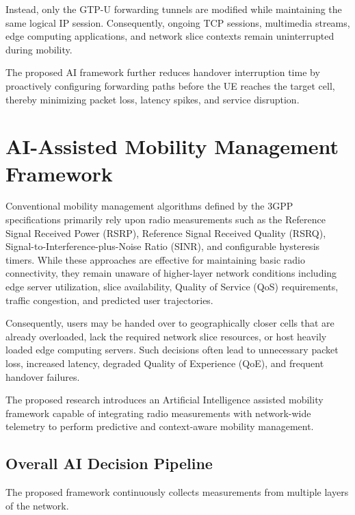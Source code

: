 \documentclass[12pt,a4paper]{article}\usepackage[a4paper,margin=1in]{geometry}\usepackage{graphicx}\usepackage{longtable}\usepackage{booktabs}\usepackage{hyperref}\usepackage{enumitem}\usepackage{amsmath}\usepackage{tikz}\usepackage{pgfgantt}\usepackage{setspace}\setstretch{1.15}\usetikzlibrary{positioning,arrows.meta,shapes.geometric}
\begin{document}
	Instead, only the GTP-U forwarding tunnels are modified while maintaining the same logical IP session. Consequently, ongoing TCP sessions, multimedia streams, edge computing applications, and network slice contexts remain uninterrupted during mobility.
	
	The proposed AI framework further reduces handover interruption time by proactively configuring forwarding paths before the UE reaches the target cell, thereby minimizing packet loss, latency spikes, and service disruption.
	
	\section{AI-Assisted Mobility Management Framework}
	
	Conventional mobility management algorithms defined by the 3GPP specifications primarily rely upon radio measurements such as the Reference Signal Received Power (RSRP), Reference Signal Received Quality (RSRQ), Signal-to-Interference-plus-Noise Ratio (SINR), and configurable hysteresis timers. While these approaches are effective for maintaining basic radio connectivity, they remain unaware of higher-layer network conditions including edge server utilization, slice availability, Quality of Service (QoS) requirements, traffic congestion, and predicted user trajectories.
	
	Consequently, users may be handed over to geographically closer cells that are already overloaded, lack the required network slice resources, or host heavily loaded edge computing servers. Such decisions often lead to unnecessary packet loss, increased latency, degraded Quality of Experience (QoE), and frequent handover failures.
	
	The proposed research introduces an Artificial Intelligence assisted mobility framework capable of integrating radio measurements with network-wide telemetry to perform predictive and context-aware mobility management.
	
	
	\subsection{Overall AI Decision Pipeline}
	
	The proposed framework continuously collects measurements from multiple layers of the network.
	
\end{document}
